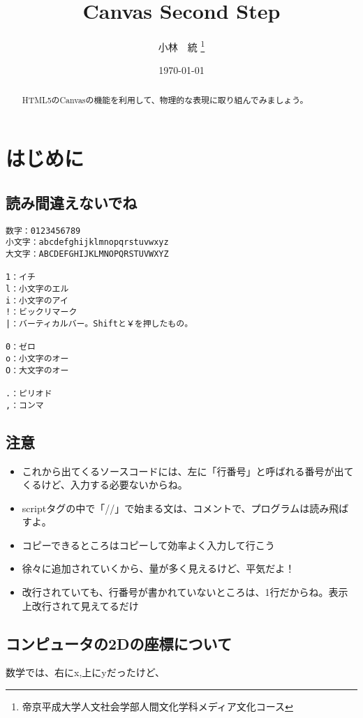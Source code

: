 \documentclass[mingoth,11pt,a4j,uplatex]{jsarticle}
\title{Canvas Second Step}
\author{小林　統 \thanks{帝京平成大学人文社会学部人間文化学科メディア文化コース}}
\date{\today}
\begin{document}

\maketitle

\begin{abstract}
HTML5のCanvasの機能を利用して、物理的な表現に取り組んでみましょう。
\end{abstract}

\tableofcontents
\newpage

\section{はじめに}
\subsection{読み間違えないでね}

\begin{lstlisting}[caption=読み間違えないでね]
数字：0123456789
小文字：abcdefghijklmnopqrstuvwxyz
大文字：ABCDEFGHIJKLMNOPQRSTUVWXYZ

1：イチ
l：小文字のエル
i：小文字のアイ
!：ビックリマーク
|：バーティカルバー。Shiftと￥を押したもの。

0：ゼロ
o：小文字のオー
O：大文字のオー

.：ピリオド
,：コンマ
\end{lstlisting}

\subsection{注意}
\begin{itemize}
\item これから出てくるソースコードには、左に「行番号」と呼ばれる番号が出てくるけど、入力する必要ないからね。

\item scriptタグの中で「//」で始まる文は、コメントで、プログラムは読み飛ばすよ。

\item コピーできるところはコピーして効率よく入力して行こう
\item 徐々に追加されていくから、量が多く見えるけど、平気だよ！
\item 改行されていても、行番号が書かれていないところは、1行だからね。表示上改行されて見えてるだけ
\end{itemize}

\subsection{コンピュータの2Dの座標について}
数学では、右にx,上にyだったけど、
\end{document}
